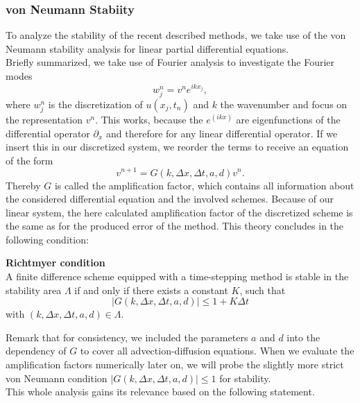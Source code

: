 \subsubsection{von Neumann Stabiity}
\label{sec: stability_theory_PDE}
To analyze the stability of the recent described methods, we take use of the von Neumann stability analysis for linear partial differential equations.\\

Briefly summarized, we take use of Fourier analysis to investigate the Fourier modes
\begin{equation*}\label{eq: fourier_modes}
w^n_j = v^ne^{ikx_j},
\end{equation*}
where $w^n_j$ is the discretization of $u(x_j, t_n)$ and $k$ the wavenumber and focus on the representation $v^n$. This works, because the $e^{(ikx)}$ are eigenfunctions of the differential operator $\partial_x$ and therefore for any linear differential operator. If we insert this in our discretized system, we reorder the terms to receive an equation of the form
\begin{equation}
\label{eq: ampfactor}
v^{n+1}=G(k, \Delta x, \Delta t, a, d)v^n.
\end{equation}
Thereby $G$ is called the amplification factor, which contains all information about the considered differential equation and the involved schemes. Because of our linear system, the here calculated amplification factor of the discretized scheme is the same as for the produced error of the method. This theory concludes in the following condition: 
\begin{prop}\textbf{Richtmyer condition}\\
	A finite difference scheme equipped with a time-stepping method is stable in the stability area $\Lambda$ if and only if there exists a constant $K$, such that
	\begin{equation*}
	\lvert G (k, \Delta x, \Delta t, a, d) \rvert \le 1+ K \Delta t
	\end{equation*}
	with $(k, \Delta x, \Delta t, a, d)\in \Lambda$. 
\end{prop}
Remark that for consistency, we included the parameters $a$ and $d$ into the dependency of $G$ to cover all advection-diffusion equations. When we evaluate the amplification factors numerically later on, we will probe the slightly more strict von Neumann condition $\lvert G (k, \Delta x, \Delta t, a, d) \rvert \le 1$ for stability. \\
This whole analysis gains its relevance based on the following statement.
